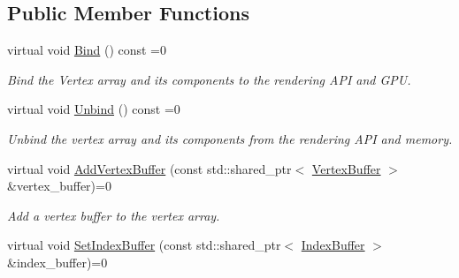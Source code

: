 \subsection*{Public Member Functions}
\begin{DoxyCompactItemize}
\item 
\mbox{\label{classengine_1_1renderer_1_1VertexArray_ab60053c2018237aa12b76d2ebe1077ef}} 
virtual void \hyperlink{classengine_1_1renderer_1_1VertexArray_ab60053c2018237aa12b76d2ebe1077ef}{Bind} () const =0
\begin{DoxyCompactList}\small\item\em Bind the Vertex array and it\textquotesingle{}s components to the rendering A\+PI and G\+PU. \end{DoxyCompactList}\item 
\mbox{\label{classengine_1_1renderer_1_1VertexArray_aec996c39722893593ad02f72a1f8eab0}} 
virtual void \hyperlink{classengine_1_1renderer_1_1VertexArray_aec996c39722893593ad02f72a1f8eab0}{Unbind} () const =0
\begin{DoxyCompactList}\small\item\em Unbind the vertex array and it\textquotesingle{}s components from the rendering A\+PI and memory. \end{DoxyCompactList}\item 
\mbox{\label{classengine_1_1renderer_1_1VertexArray_a13355d9a1eb63677fe19b911ac5a5fe0}} 
virtual void \hyperlink{classengine_1_1renderer_1_1VertexArray_a13355d9a1eb63677fe19b911ac5a5fe0}{Add\+Vertex\+Buffer} (const std\+::shared\+\_\+ptr$<$ \hyperlink{classengine_1_1renderer_1_1VertexBuffer}{Vertex\+Buffer} $>$ \&vertex\+\_\+buffer)=0
\begin{DoxyCompactList}\small\item\em Add a vertex buffer to the vertex array. \end{DoxyCompactList}\item 
\mbox{\label{classengine_1_1renderer_1_1VertexArray_a0eb0b7ee1d2c1946283c71f8d2ff72f2}} 
virtual void \hyperlink{classengine_1_1renderer_1_1VertexArray_a0eb0b7ee1d2c1946283c71f8d2ff72f2}{Set\+Index\+Buffer} (const std\+::shared\+\_\+ptr$<$ \hyperlink{classengine_1_1renderer_1_1IndexBuffer}{Index\+Buffer} $>$ \&index\+\_\+buffer)=0

\end{DoxyCompactItemize}
